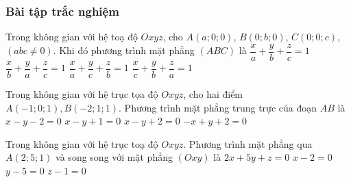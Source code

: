 \subsubsection{Bài tập trắc nghiệm}
\begin{ex}%
	Trong không gian với hệ toạ độ $Oxyz$, cho $A\left( a;0;0 \right)$, $B\left( 0;b;0 \right)$, $C\left( 0;0;c \right)$, $\left( abc\ne 0 \right)$. Khi đó phương trình mặt phẳng $\left( ABC \right)$ là
	\choice
	{\True $\dfrac{x}{a}+\dfrac{y}{b}+\dfrac{z}{c}=1$}
	{$\dfrac{x}{b}+\dfrac{y}{a}+\dfrac{z}{c}=1$}
	{$\dfrac{x}{a}+\dfrac{y}{c}+\dfrac{z}{b}=1$}
	{$\dfrac{x}{c}+\dfrac{y}{b}+\dfrac{z}{a}=1$}
\end{ex}
\begin{ex}%
	Trong không gian với hệ trục tọa độ $Oxyz$, cho hai điểm $A(-1;0;1),B(-2;1;1)$. Phương trình mặt phẳng trung trực của đoạn $AB$ là
	\choice
	{$x-y-2=0$}
	{$x-y+1=0$}
	{\True $x-y+2=0$}
	{$-x+y+2=0$}
\end{ex}

\begin{ex}%
	Trong không gian với hệ trục toạ độ $Oxyz$. Phương trình mặt phẳng qua $A\left( 2;5;1 \right)$ và song song với mặt phẳng $\left( Oxy \right)$ là
	\choice
	{$2x+5y+z=0$}
	{$x-2=0$}
	{$y-5=0$}
	{\True $z-1=0$}
\end{ex}

